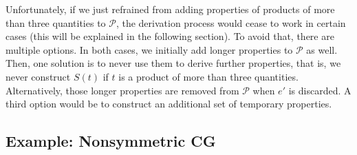 Unfortunately, if we just refrained from adding properties of products of more than three quantities to $\mathcal{P}$, the derivation process would cease to work in certain cases (this will be explained in the following section). To avoid that, there are multiple options. In both cases, we initially add longer properties to $\mathcal{P}$ as well. Then, one solution is to never use them to derive further properties, that is, we never construct $S(t)$ if $t$ is a product of more than three quantities. Alternatively, those longer properties are removed from $\mathcal{P}$ when $e'$ is discarded. A third option would be to construct an additional set of temporary properties.

\subsection{Example: Nonsymmetric CG}
\label{sec:derivationOfPropertiesExample}

